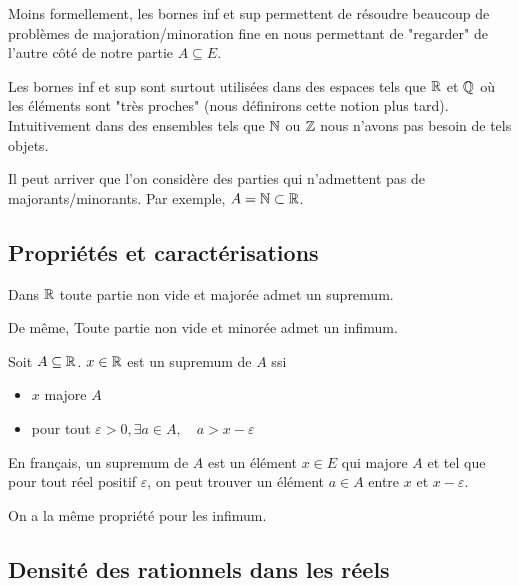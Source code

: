 \begin{remark}
    Moins formellement, les bornes inf et sup permettent de résoudre beaucoup de problèmes de majoration/minoration
    fine en nous permettant de "regarder" de l'autre côté de notre partie $A \subseteq E$. 

    Les bornes inf et sup sont surtout utilisées dans des espaces tels que $\mathbb{R}$ et $\mathbb{Q}$ où les éléments sont "très proches"
    (nous définirons cette notion plus tard). Intuitivement dans des ensembles tels que $\mathbb{N}$ ou $\mathbb{Z}$ nous n'avons pas besoin 
    de tels objets. 
\end{remark}

\begin{example}
    Il peut arriver que l'on considère des parties qui n'admettent pas de majorants/minorants. 
    Par exemple, $A = \mathbb{N} \subset \mathbb{R}$. 
\end{example}

\subsection{Propriétés et caractérisations}

\begin{theorem}[Existence]
    Dans $\mathbb{R}$ toute partie non vide et majorée admet un supremum. 

    De même, {Toute partie non vide et minorée admet un infimum.}
\end{theorem}

\begin{proposition}
    Soit $A \subseteq \mathbb{R}$. $x \in \mathbb{R}$ est un supremum de $A$ ssi 
    \begin{itemize}
        \item $x$ majore $A$
        \item pour tout $\varepsilon > 0, \exists a \in A, \quad a > x - \varepsilon $
    \end{itemize}
    En français, un supremum de $A$ est un élément $x \in E$ qui majore $A$ et tel que pour tout réel 
    positif $\varepsilon$, on peut trouver un élément $a \in A$ entre $x$ et $x - \varepsilon$. 

    On a la même propriété pour les infimum. 
\end{proposition}

\subsection{Densité des rationnels dans les réels}

